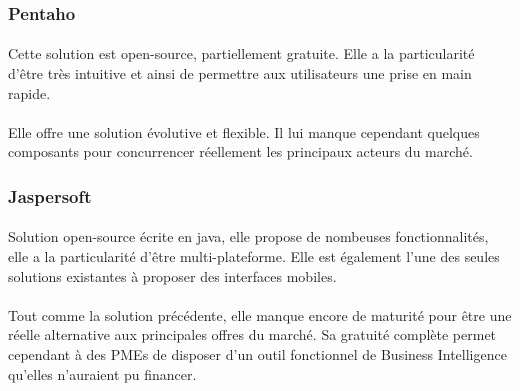 \subsubsection{Pentaho}

\paragraph{} Cette solution est open-source, partiellement gratuite. Elle a la particularité d’être très intuitive et ainsi de permettre aux utilisateurs une prise en main rapide. 

\paragraph{} Elle offre une solution évolutive et flexible. Il lui manque cependant quelques composants pour concurrencer réellement les principaux acteurs du marché.

\subsubsection{Jaspersoft}

\paragraph{} Solution open-source écrite en java, elle propose de nombeuses fonctionnalités, elle a la particularité d’être multi-plateforme. Elle est également l’une des seules solutions existantes à proposer des interfaces mobiles.

\paragraph{} Tout comme la solution précédente, elle manque encore de maturité pour être une réelle alternative aux principales offres du marché. Sa gratuité complète permet cependant à des PMEs de disposer d’un outil fonctionnel de Business Intelligence qu’elles n’auraient pu financer.
